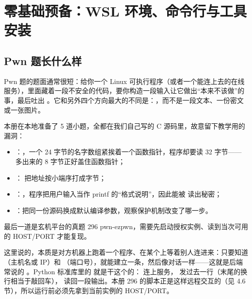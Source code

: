 \documentclass[UTF8,12pt,oneside]{ctexbook}
\begin{document}
\tableofcontents
\mainmatter

\chapter{零基础预备：WSL 环境、命令行与工具安装}

\section{Pwn 题长什么样}
Pwn 题的题面通常很短：给你一个 Linux 可执行程序（或者一个能连上去的在线服务），里面藏着一段不安全的代码，要你构造一段输入让它做出“本来不该做”的事，最后吐出 。它和另外四个方向最大的不同是：，而不是一段文本、一份密文或一张图片。

本册在本地准备了 5 道小题，全都在我们自己写的 C 源码里，故意留下教学用的漏洞：
\begin{itemize}
\item {}：，一个 24 字节的名字数组紧挨着一个函数指针，程序却要读 32 字节——多出来的 8 字节正好盖住函数指针；
\item {}： 把地址按小端序打成字节；
\item {}：，程序把用户输入当作 printf 的“格式说明”，因此能被  读出秘密；
\item {}：把同一份源码换成默认编译参数，观察保护机制改变了哪一步。
\end{itemize}
最后一道是玄机平台的真题 296 pwn-ezpwn，需要先启动授权实例、读到当次可用的 HOST/PORT 才能复现。

这里说的，本质是对方机器上跑着一个程序、在某个上等着别人连进来：只要知道 （主机名或 IP）和 （端口号），就能建立一条，然后像对话一样——这就是后端常说的 。Python 标准库里的  就是干这个的： 连上服务， 发过去一行（末尾的换行相当于敲回车）， 读回一段输出。本册 296 的脚本正是这样远程交互的（见 4.6 节），所以运行前必须先拿到当前实例的 HOST/PORT。
\end{document}
